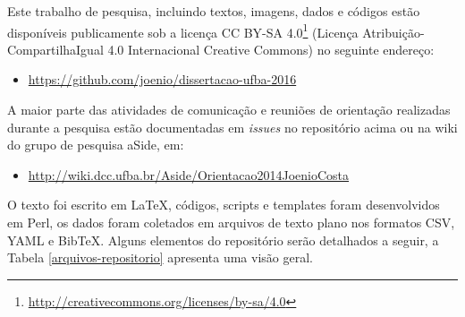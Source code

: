 {}
\label{reproducibilidade-do-estudo}


Este trabalho de pesquisa, incluindo textos, imagens, dados e códigos estão
disponíveis publicamente sob a
licença CC BY-SA 4.0\footnote{\url{http://creativecommons.org/licenses/by-sa/4.0}}
(Licença Atribuição-CompartilhaIgual 4.0 Internacional Creative Commons)
no seguinte endereço:

\begin{itemize}
  \item \url{https://github.com/joenio/dissertacao-ufba-2016}
\end{itemize}

A maior parte das atividades de comunicação e reuniões de orientação realizadas
durante a pesquisa estão documentadas em {\it issues} no repositório acima ou na wiki do
grupo de pesquisa aSide, em:

\begin{itemize}
  \item \url{http://wiki.dcc.ufba.br/Aside/Orientacao2014JoenioCosta}
\end{itemize}

O texto foi escrito em \LaTeX, códigos, scripts e templates foram desenvolvidos
em Perl, os dados foram coletados em arquivos de texto plano nos formatos CSV,
YAML e BibTeX. Alguns elementos do repositório serão detalhados a seguir, a Tabela
\ref{arquivos-repositorio} apresenta uma visão geral.


